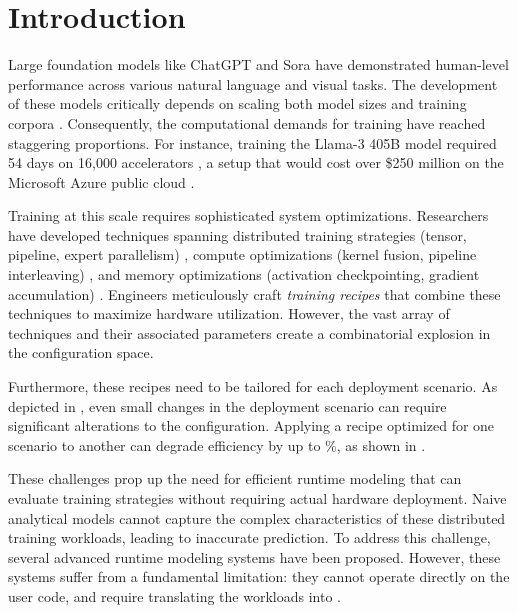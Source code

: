 \section{Introduction}\label{sec:Introduction}







Large foundation models like ChatGPT \cite{openai2023chatgpt} and Sora \cite{sora} have demonstrated human-level performance across various natural language and visual tasks. The development of these models critically depends on scaling both model sizes and training corpora \cite{kaplan2020scaling}. Consequently, the computational demands for training have reached staggering proportions. For instance, training the Llama-3 405B model required 54 days on 16,000 accelerators \cite{dubey2024llama}, a setup that would cost over \$250 million on the Microsoft Azure public cloud \cite{dubey2024llama}.

Training at this scale requires sophisticated system optimizations. Researchers have developed techniques spanning distributed training strategies (tensor, pipeline, expert parallelism) \cite{megatron,singh2023hybrid}, compute optimizations (kernel fusion, pipeline interleaving) \cite{megatron}, and memory optimizations (activation checkpointing, gradient accumulation) \cite{megatron,zero,korthikanti2023reducing}. Engineers meticulously craft \textit{training recipes} that combine these techniques to maximize hardware utilization. However, the vast array of techniques and their associated parameters create a combinatorial explosion in the configuration space.

Furthermore, these recipes need to be tailored for each deployment scenario. As depicted in , even small changes in the deployment scenario can require significant alterations to the configuration. Applying a recipe optimized for one scenario to another can degrade efficiency by up to \ctc{}\%, as shown in .

These challenges prop up the need for efficient runtime modeling that can evaluate training strategies without requiring actual hardware deployment. Naive analytical models cannot capture the complex characteristics of these distributed training workloads, leading to inaccurate prediction. To address this challenge, several advanced runtime modeling systems \cite{duan2023proteus,bang2023vtrain,lu2023distsim,zhu2020daydream,isaev2023calculon,moolchandani2023amped,santhanam2021distir} have been proposed. However, these systems suffer from a fundamental limitation: they cannot operate directly on the user code, and require translating the workloads into \textit{\csl}.

